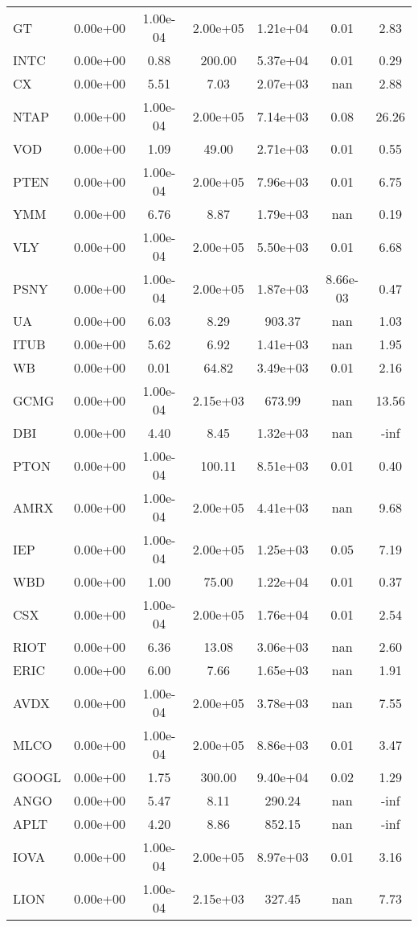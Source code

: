 \documentclass[12pt,a4paper]{article}
\begin{document}
\begin{longtable}{@{}lS[table-format=1.2e-1]S[table-format=1.2e-1]S[table-format=3.2]S[table-format=1.2e+4]S[table-format=1.2]S[table-format=4.2]@{}}
GT & 0.00e+00 & 1.00e-04 & 2.00e+05 & 1.21e+04 & 0.01 & 2.83 \\
INTC & 0.00e+00 & 0.88 & 200.00 & 5.37e+04 & 0.01 & 0.29 \\
CX & 0.00e+00 & 5.51 & 7.03 & 2.07e+03 & {nan} & 2.88 \\
NTAP & 0.00e+00 & 1.00e-04 & 2.00e+05 & 7.14e+03 & 0.08 & 26.26 \\
VOD & 0.00e+00 & 1.09 & 49.00 & 2.71e+03 & 0.01 & 0.55 \\
PTEN & 0.00e+00 & 1.00e-04 & 2.00e+05 & 7.96e+03 & 0.01 & 6.75 \\
YMM & 0.00e+00 & 6.76 & 8.87 & 1.79e+03 & {nan} & 0.19 \\
VLY & 0.00e+00 & 1.00e-04 & 2.00e+05 & 5.50e+03 & 0.01 & 6.68 \\
PSNY & 0.00e+00 & 1.00e-04 & 2.00e+05 & 1.87e+03 & 8.66e-03 & 0.47 \\
UA & 0.00e+00 & 6.03 & 8.29 & 903.37 & {nan} & 1.03 \\
ITUB & 0.00e+00 & 5.62 & 6.92 & 1.41e+03 & {nan} & 1.95 \\
WB & 0.00e+00 & 0.01 & 64.82 & 3.49e+03 & 0.01 & 2.16 \\
GCMG & 0.00e+00 & 1.00e-04 & 2.15e+03 & 673.99 & {nan} & 13.56 \\
DBI & 0.00e+00 & 4.40 & 8.45 & 1.32e+03 & {nan} & {-inf} \\
PTON & 0.00e+00 & 1.00e-04 & 100.11 & 8.51e+03 & 0.01 & 0.40 \\
AMRX & 0.00e+00 & 1.00e-04 & 2.00e+05 & 4.41e+03 & {nan} & 9.68 \\
IEP & 0.00e+00 & 1.00e-04 & 2.00e+05 & 1.25e+03 & 0.05 & 7.19 \\
WBD & 0.00e+00 & 1.00 & 75.00 & 1.22e+04 & 0.01 & 0.37 \\
CSX & 0.00e+00 & 1.00e-04 & 2.00e+05 & 1.76e+04 & 0.01 & 2.54 \\
RIOT & 0.00e+00 & 6.36 & 13.08 & 3.06e+03 & {nan} & 2.60 \\
ERIC & 0.00e+00 & 6.00 & 7.66 & 1.65e+03 & {nan} & 1.91 \\
AVDX & 0.00e+00 & 1.00e-04 & 2.00e+05 & 3.78e+03 & {nan} & 7.55 \\
MLCO & 0.00e+00 & 1.00e-04 & 2.00e+05 & 8.86e+03 & 0.01 & 3.47 \\
GOOGL & 0.00e+00 & 1.75 & 300.00 & 9.40e+04 & 0.02 & 1.29 \\
ANGO & 0.00e+00 & 5.47 & 8.11 & 290.24 & {nan} & {-inf} \\
APLT & 0.00e+00 & 4.20 & 8.86 & 852.15 & {nan} & {-inf} \\
IOVA & 0.00e+00 & 1.00e-04 & 2.00e+05 & 8.97e+03 & 0.01 & 3.16 \\
LION & 0.00e+00 & 1.00e-04 & 2.15e+03 & 327.45 & {nan} & 7.73 \\
\end{longtable}
\end{document}
